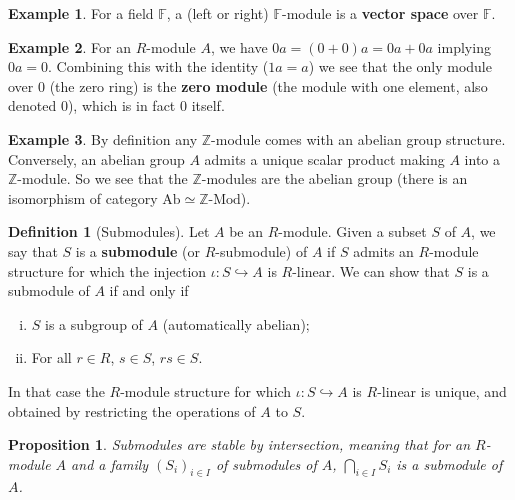 \documentclass[a4paper,12pt,parskip=half*,chapterprefix=true,numbers=noendperiod]{scrreprt}
\newtheorem{proposition}{Proposition}[section]
\theoremstyle{definition}
\newtheorem{definition}{Definition}[section]
\newtheorem{example}{Example}[section]
\theoremstyle{remark}
\begin{document}
\begin{example}
	For a field $\mathbb{F}$, a (left or right) $\mathbb{F}$-module is a \textbf{vector space} over $\mathbb{F}$.
\end{example}
\begin{example}
	For an $R$-module $A$, we have $0a=(0+0)a=0a+0a$ implying $0a=0$. Combining this with the identity ($1a=a$) we see that the only module over $0$ (the zero ring) is the \textbf{zero module} (the module with one element, also denoted $0$), which is in fact $0$ itself.
\end{example}
\begin{example}
	By definition any $\mathbb{Z}$-module comes with an abelian group structure. Conversely, an abelian group $A$ admits a unique scalar product making $A$ into a $\mathbb{Z}$-module. So we see that the $\mathbb{Z}$-modules are the abelian group (there is an isomorphism of category $\text{Ab}\simeq\mathbb{Z}\text{-Mod}$).
\end{example}

\begin{definition}[Submodules]
	Let $A$ be an $R$-module. Given a subset $S$ of $A$, we say that $S$ is a \textbf{submodule} (or $R$-submodule) of $A$ if $S$ admits an $R$-module structure for which the injection $\iota:S\hookrightarrow A$ is $R$-linear. We can show that $S$ is a submodule of $A$ if and only if
	\begin{enumerate}[(i)]
		\item $S$ is a subgroup of $A$ (automatically abelian);
		\item For all $r\in R$, $s\in S$, $rs\in S$.
	\end{enumerate}
	In that case the $R$-module structure for which $\iota:S\hookrightarrow A$ is $R$-linear is unique, and obtained by restricting the operations of $A$ to $S$.
\end{definition}

\begin{proposition}
	Submodules are stable by intersection, meaning that for an $R$-module $A$ and a family $(S_i)_{i\in I}$ of submodules of $A$, $\bigcap_{i\in I}S_i$ is a submodule of $A$.
\end{proposition}
\end{document}
